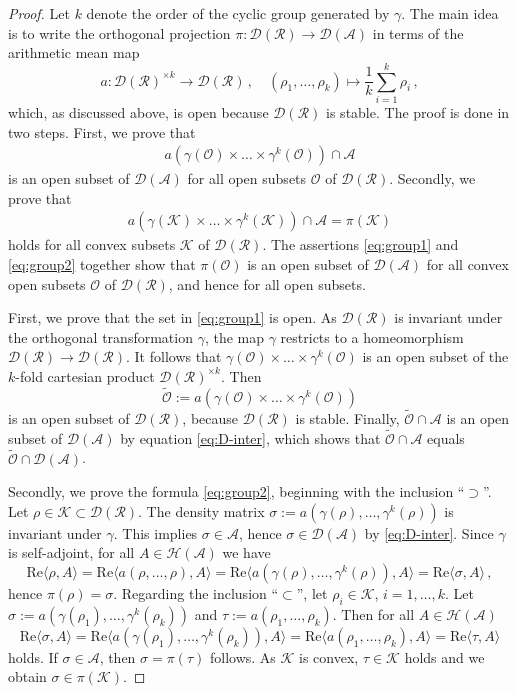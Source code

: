 \documentclass[a4paper,11pt,reqno]{amsart}
\newcommand{\cA}{\mathcal{A}}
\newcommand{\cD}{\mathcal{D}}
\newcommand{\cH}{\mathcal{H}}
\newcommand{\cK}{\mathcal{K}}
\newcommand{\cO}{\mathcal{O}}
\newcommand{\cR}{\mathcal{R}}
\renewcommand\Re{\mathrm{Re}}
\theoremstyle{definition}
\theoremstyle{remark}
\numberwithin{equation}{section}
\begin{document}
\begin{proof}
Let $k$ denote the order of the cyclic group generated by $\gamma$. The main idea 
is to write the orthogonal projection $\pi:\cD(\cR)\to\cD(\cA)$ in terms of the 
arithmetic mean map
\[\textstyle
a:\cD(\cR)^{\times k}\to\cD(\cR)\,,
\quad
(\rho_1,\dots,\rho_k)\mapsto\frac{1}{k}\sum_{i=1}^k\rho_i\,,
\]
which, as discussed above, is open because $\cD(\cR)$ is stable. The proof is done 
in two steps. First, we prove that 
\begin{align}\label{eq:group1}
a(\gamma(\cO)\times\dots\times\gamma^k(\cO))\cap\cA
\end{align}
is an open subset of $\cD(\cA)$ for all open subsets $\cO$ of 
$\cD(\cR)$. Secondly, we prove that 
\begin{align}\label{eq:group2}
a(\gamma(\cK)\times\dots\times\gamma^k(\cK))\cap\cA=\pi(\cK)
\end{align}
holds for all convex subsets $\cK$ of $\cD(\cR)$. The assertions \eqref{eq:group1}
and \eqref{eq:group2} together show that $\pi(\cO)$ is an open subset of $\cD(\cA)$ 
for all convex open subsets $\cO$ of $\cD(\cR)$, and hence for all open subsets.
\par
%
First, we prove that the set in \eqref{eq:group1} is open. As $\cD(\cR)$ is 
invariant under the orthogonal transformation $\gamma$, the map $\gamma$ 
restricts to a homeomorphism $\cD(\cR)\to\cD(\cR)$. It follows that 
$\gamma(\cO)\times\dots\times\gamma^k(\cO)$ is an open subset of the $k$-fold 
cartesian product $\cD(\cR)^{\times k}$. Then
\[
\widetilde{\cO}:=a(\gamma(\cO)\times\dots\times\gamma^k(\cO))
\]
is an open subset of $\cD(\cR)$, because $\cD(\cR)$ is stable. Finally, 
$\widetilde{\cO}\cap\cA$ is an open subset of $\cD(\cA)$ by equation 
\eqref{eq:D-inter}, which shows that $\widetilde{\cO}\cap\cA$ equals 
$\widetilde{\cO}\cap\cD(\cA)$. 
\par
%
Secondly, we prove the formula \eqref{eq:group2}, beginning with the inclusion 
``$\supset$''. Let $\rho\in\cK\subset\cD(\cR)$. The density matrix
$\sigma:=a(\gamma(\rho),\dots,\gamma^k(\rho))$ is invariant under $\gamma$. 
This implies $\sigma\in\cA$, hence $\sigma\in\cD(\cA)$ by \eqref{eq:D-inter}. 
Since $\gamma$ is self-adjoint, for all $A\in\cH(\cA)$ we have
\[\textstyle
\Re\langle\rho,A\rangle
=\Re\langle a(\rho,\dots,\rho),A\rangle
=\Re\langle a(\gamma(\rho),\dots,\gamma^k(\rho)),A\rangle
=\Re\langle\sigma,A\rangle\,,
\]
hence $\pi(\rho)=\sigma$. Regarding the inclusion ``$\subset$'',
let $\rho_i\in\cK$, $i=1,\dots,k$. Let 
$\sigma:=a(\gamma(\rho_1),\dots,\gamma^k(\rho_k))$ and 
$\tau:=a(\rho_1,\dots,\rho_k)$. Then for all $A\in\cH(\cA)$
\[\textstyle
\Re\langle\sigma,A\rangle
=\Re\langle a(\gamma(\rho_1),\dots,\gamma^k(\rho_k)),A\rangle
=\Re\langle a(\rho_1,\dots,\rho_k),A\rangle
=\Re\langle\tau,A\rangle
\]
holds. If $\sigma\in\cA$, then $\sigma=\pi(\tau)$ follows. 
As $\cK$ is convex, $\tau\in\cK$ holds and we obtain $\sigma\in\pi(\cK)$.
\end{proof}
\end{document}
